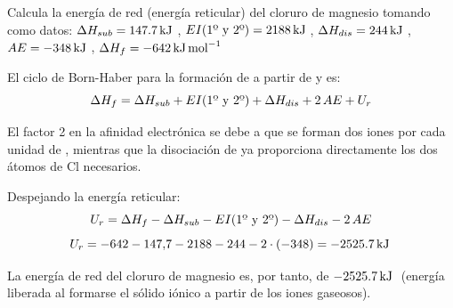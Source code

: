 \begin{exercise}
    Calcula la energía de red (energía reticular) del cloruro de magnesio tomando como datos: $\entalpia{sub} =  \energia[kj]{147.7}$, $EI (\text{1º y 2º}) = \energia[kj]{2188}$,  $\entalpia{dis} =  \energia[kj]{244}$, $AE = \energia[kj]{-348}$, $\entalpia{f} =  \energia[kjmol]{-642}$
    \begin{solu}

        El ciclo de Born-Haber para la formación de  a partir de  y  es:
        \[
            \Delta H_{f} = \Delta H_{sub} + EI(\text{1º y 2º}) + \Delta H_{dis} + 2 \, AE + U_r
        \]

        El factor 2 en la afinidad electrónica se debe a que se forman dos iones  por cada unidad de , mientras que la disociación de  ya proporciona directamente los dos átomos de Cl necesarios.

        Despejando la energía reticular:
        \[
            U_r = \Delta H_{f} - \Delta H_{sub} - EI(\text{1º y 2º}) - \Delta H_{dis} - 2 \, AE
        \]
        \[
            U_r = -642 - 147{,}7 - 2188 - 244 - 2\cdot(-348) = \energia[kj]{-2525,7}
        \]

        La energía de red del cloruro de magnesio es, por tanto, de \(\energia[kj]{-2525,7}\) (energía liberada al formarse el sólido iónico a partir de los iones gaseosos).
    \end{solu}
\end{exercise}

